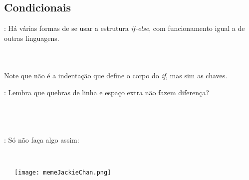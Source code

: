\subsection{Condicionais}


\begin{frame}{\insertsection: \insertsubsection}
  Há várias formas de se usar a estrutura \textit{if-else}, com funcionamento igual a de outras linguagens.
  \begin{columns}[t]
    \inputminted[firstline=01,lastline=03]{arduino}{sketches/introLinguagem/.condicionais.ino}
    \inputminted[firstline=01,lastline=06]{arduino}{sketches/introLinguagem/.condicionais.ino}
    \inputminted[firstline=8,lastline=16]{arduino}{sketches/introLinguagem/.condicionais.ino}
  \end{columns}
  Note que não é a indentação que define o corpo do \textit{if}, mas sim as chaves.
\end{frame}


\begin{frame}{\insertsection: \insertsubsection}
  Lembra que quebras de linha e espaço extra não fazem diferença?
  \begin{columns}[t]
    \inputminted[firstline=01,lastline=06]{arduino}{sketches/introLinguagem/.condicionais.ino}\vspace{-\bigskipamount}\\
    \inputminted[firstline=18,lastline=22]{arduino}{sketches/introLinguagem/.condicionais.ino}
    \inputminted[firstline=24,lastline=31]{arduino}{sketches/introLinguagem/.condicionais.ino}
    \inputminted[firstline=33,lastline=39]{arduino}{sketches/introLinguagem/.condicionais.ino}
  \end{columns}
\end{frame}


\begin{frame}{\insertsection: \insertsubsection}
  Só não faça algo assim:
  \begin{columns}[t]
    \inputminted[firstline=41,lastline=41]{arduino}{sketches/introLinguagem/.condicionais.ino}\\
    \texttt{[image: memeJackieChan.png]}
    \inputminted[firstline=43,lastline=52]{arduino}{sketches/introLinguagem/.condicionais.ino}
  \end{columns}
\end{frame}


